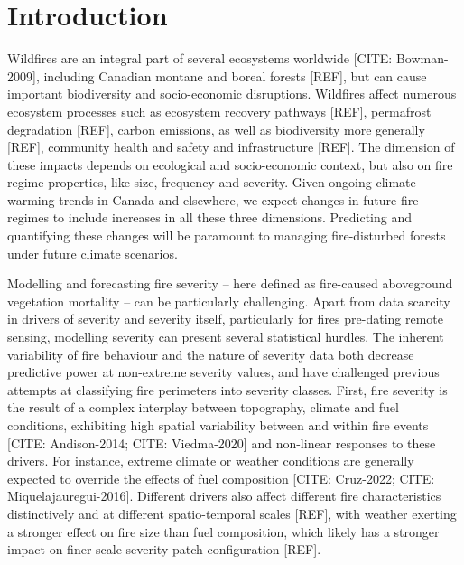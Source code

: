 \documentclass[
  numafflabel,
  authoryear,
  preprint]{elsarticle}
\begin{document}
\section{Introduction}\label{introduction}

Wildfires are an integral part of several ecosystems worldwide {[}CITE:
Bowman-2009{]}, including Canadian montane and boreal forests {[}REF{]},
but can cause important biodiversity and socio-economic disruptions.
Wildfires affect numerous ecosystem processes such as ecosystem recovery
pathways {[}REF{]}, permafrost degradation {[}REF{]}, carbon emissions,
as well as biodiversity more generally {[}REF{]}, community health and
safety and infrastructure {[}REF{]}. The dimension of these impacts
depends on ecological and socio-economic context, but also on fire
regime properties, like size, frequency and severity. Given ongoing
climate warming trends in Canada and elsewhere, we expect changes in
future fire regimes to include increases in all these three dimensions.
Predicting and quantifying these changes will be paramount to managing
fire-disturbed forests under future climate scenarios.

Modelling and forecasting fire severity -- here defined as fire-caused
aboveground vegetation mortality -- can be particularly challenging.
Apart from data scarcity in drivers of severity and severity itself,
particularly for fires pre-dating remote sensing, modelling severity can
present several statistical hurdles. The inherent variability of fire
behaviour and the nature of severity data both decrease predictive power
at non-extreme severity values, and have challenged previous attempts at
classifying fire perimeters into severity classes. First, fire severity
is the result of a complex interplay between topography, climate and
fuel conditions, exhibiting high spatial variability between and within
fire events {[}CITE: Andison-2014; CITE: Viedma-2020{]} and non-linear
responses to these drivers. For instance, extreme climate or weather
conditions are generally expected to override the effects of fuel
composition {[}CITE: Cruz-2022; CITE: Miquelajauregui-2016{]}. Different
drivers also affect different fire characteristics distinctively and at
different spatio-temporal scales {[}REF{]}, with weather exerting a
stronger effect on fire size than fuel composition, which likely has a
stronger impact on finer scale severity patch configuration {[}REF{]}.
\end{document}
